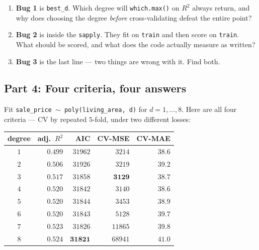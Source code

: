 \documentclass{article}
\begin{document}
\begin{enumerate}[label={\bfseries (\Alph*)},itemsep=.8em]
\item \textbf{Bug 1} is \texttt{best\_d}. Which degree will \texttt{which.max()} on $R^2$ always return, and why does choosing the degree \emph{before} cross-validating defeat the entire point? \\[4em]
\item \textbf{Bug 2} is inside the \texttt{sapply}. They fit on \texttt{train} and then score on \texttt{train}. What should be scored, and what does the code actually measure as written? \\[4em]
\item \textbf{Bug 3} is the last line --- two things are wrong with it. Find both. \\[4em]
\end{enumerate}

\newpage

\subsection*{Part 4: Four criteria, four answers}

Fit \texttt{sale\_price $\sim$ poly(living\_area, d)} for $d = 1, \ldots, 8$. Here are all four criteria --- CV by repeated $5$-fold, under two different losses:

\begin{center}
\renewcommand{\arraystretch}{1.25}
\begin{tabular}{crrrr}
\toprule
degree & adj.\ $R^2$ & AIC & CV-MSE & CV-MAE \\
\midrule
$1$ & $0.499$ & $31962$ & $3214$ & $\mathbf{38.6}$ \\
$2$ & $0.506$ & $31926$ & $3219$ & $39.2$ \\
$3$ & $0.517$ & $31858$ & $\mathbf{3129}$ & $38.7$ \\
$4$ & $0.520$ & $31842$ & $3140$ & $38.6$ \\
$5$ & $0.520$ & $31844$ & $3453$ & $38.9$ \\
$6$ & $0.520$ & $31843$ & $5128$ & $39.7$ \\
$7$ & $0.523$ & $31826$ & $11865$ & $39.8$ \\
$8$ & $\mathbf{0.524}$ & $\mathbf{31821}$ & $68941$ & $41.0$ \\
\bottomrule
\end{tabular}
\end{center}

\smallskip
{}
\end{document}
